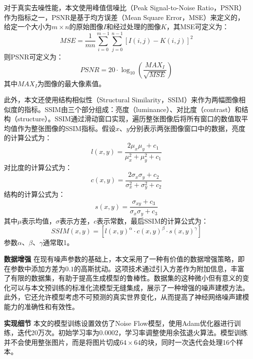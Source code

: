 对于真实去噪性能，本文使用峰值信噪比（Peak Signal-to-Noise Ratio，PSNR）作为指标之一，PSNR是基于均方误差（Mean Square Error，MSE）来定义的，给定一个大小为$m \times n$的原始图像$I$和经过处理的图像$K$，其MSE可定义为：
\begin{equation}
	M S E=\frac{1}{m n} \sum_{i=0}^{m-1} \sum_{j=0}^{n-1}[I(i, j)-K(i, j)]^2
\end{equation}
则PSNR可定义为：
\begin{equation}
	PSNR=20 \cdot \log _{10}\left(\frac{M A X_I}{\sqrt{M S E}}\right)
\end{equation}
其中$M A X_I$为图像的最大像素值。

此外，本文还使用结构相似性（Structural Similarity，SSIM）来作为两幅图像相似度的指标。SSIM由三个部分组成：亮度（luminance）、对比度（contrast）和结构（structure）。SSIM通过滑动窗口实现，遍历整张图像后将所有窗口的数值取平均值作为整张图像的SSIM指标。假设$x$、$y$分别表示两张图像窗口中的数据，亮度的计算公式为：
\begin{equation}
	l(x, y)=\frac{2 \mu_x \mu_y+c_1}{\mu_x^2+\mu_y^2+c_1}
\end{equation}
对比度的计算公式为：
\begin{equation}
	c(x, y)=\frac{2 \sigma_x \sigma_y+c_2}{\sigma_x^2+\sigma_y^2+c_2}
\end{equation}
结构的计算公式为：
\begin{equation}
	s(x, y)=\frac{\sigma_{x y}+c_3}{\sigma_x \sigma_y+c_3}
\end{equation}
其中$\mu$表示均值，$\sigma$表示方差，$c$表示常数，最后SSIM的计算公式为：
\begin{equation}
	SSIM(x, y)=\left[l(x, y)^\alpha \cdot c(x, y)^\beta \cdot s(x, y)^\gamma\right]
\end{equation}
参数$\alpha$、$\beta$、$\gamma$通常取1。

\noindent\textbf{数据增强} \quad 在现有噪声参数的基础上，本文采用了一种有价值的数据增强策略，即在参数中添加方差为$0.1$的高斯扰动。这项技术通过引入方差作为附加信息，丰富了有限的数据集，有助于提高生成模型的鲁棒性。数据集的这种微小但有意义的变化可以与本文预训练的标准化流模型无缝集成，展示了一种增强的噪声建模方法。此外，它还允许模型考虑不可预测的真实世界变化，从而提高了神经网络噪声建模能力的准确性和有效性。


\noindent\textbf{实现细节} \quad 本文的模型训练设置效仿了Noise Flow模型\cite{noiseflow}，使用Adam优化器进行训练，迭代20万次。初始学习率为0.0002，学习率调整使用余弦退火算法。模型训练并不会使用整张图片，而是将图片切成$64\times 64$的块，同时一次迭代会处理16个样本。

